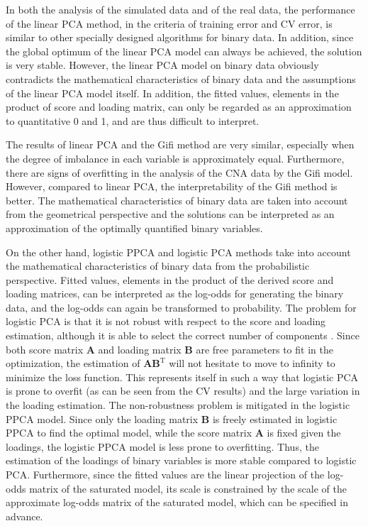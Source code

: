 In both the analysis of the simulated data and of the real data, the performance of the linear PCA method, in the criteria of training error and CV error, is similar to other specially designed algorithms for binary data. In addition, since the global optimum of the linear PCA model can always be achieved, the solution is very stable. However, the linear PCA model on binary data obviously contradicts the mathematical characteristics of binary data and the assumptions of the linear PCA model itself. In addition, the fitted values, elements in the product of score and loading matrix, can only be regarded as an approximation to quantitative 0 and 1, and are thus difficult to interpret.

The results of linear PCA and the Gifi method are very similar, especially when the degree of imbalance in each variable is approximately equal. Furthermore, there are signs of overfitting in the analysis of the CNA data by the Gifi model. However, compared to linear PCA, the interpretability of the Gifi method is better. The mathematical characteristics of binary data are taken into account from the geometrical perspective and the solutions can be interpreted as an approximation of the optimally quantified binary variables.

On the other hand, logistic PPCA and logistic PCA methods take into account the mathematical characteristics of binary data from the probabilistic perspective. Fitted values, elements in the product of the derived score and loading matrices, can be interpreted as the log-odds for generating the binary data, and the log-odds can again be transformed to probability. The problem for logistic PCA is that it is not robust with respect to the score and loading estimation, although it is able to select the correct number of components \cite{de2006principal}. Since both score matrix $\mathbf{A}$ and loading matrix $\mathbf{B}$ are free parameters to fit in the optimization, the estimation of $\mathbf{A}\mathbf{B}^{\text{T}}$ will not hesitate to move to infinity to minimize the loss function. This represents itself in such a way that logistic PCA is prone to overfit (as can be seen from the CV results) and the large variation in the loading estimation. The non-robustness problem is mitigated in the logistic PPCA model. Since only the loading matrix $\mathbf{B}$ is freely estimated in logistic PPCA to find the optimal model, while the score matrix $\mathbf{A}$ is fixed given the loadings, the logistic PPCA model is less prone to overfitting. Thus, the estimation of the loadings of binary variables is more stable compared to logistic PCA. Furthermore, since the fitted values are the linear projection of the log-odds matrix of the saturated model, its scale is constrained by the scale of the approximate log-odds matrix of the saturated model, which can be specified in advance.

